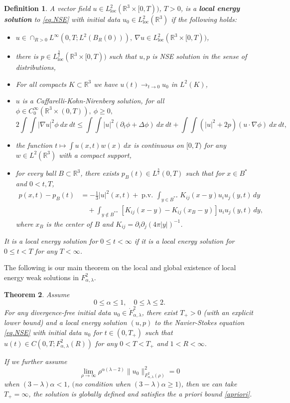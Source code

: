 \documentclass[11pt]{article}
\numberwithin{equation}{section}
\newtheorem{thm}{Theorem}[section]
\newtheorem{defn}[thm]{Definition}
\theoremstyle{remark}
\theoremstyle{definition}
\newcommand{\bkt}[1]{\left [ #1 \right ]}
\newcommand{\R}{\mathbb{R}}
\newcommand\al{\alpha}
\newcommand\la{\lambda}
\newcommand{\pv} {\mathop{\mathrm{p.v.\!}}}
\newcommand{\EQ}[1]{\begin{equation} #1 \end{equation}}
\newcommand{\EQS}[1]{\begin{equation}\begin{split} #1 \end{split}\end{equation}}
\newcommand{\loc}{{\mathrm{loc}}}
\begin{document}
\begin{defn}
  A vector field $u\in L^2_{\loc}(\R^3\times [0,T))$, $T>0$, is a \textbf{local energy solution} to \eqref{eq.NSE} with initial data $u_0\in L^2_{\loc}(\R^3)$ if the following holds:
  \begin{itemize}
    \item $u\in\cap_{R>0}L^{\infty}(0,T;L^2(B_R(0))),~\nabla u\in L^2_{\loc}(\R^3\times[0,T))$,
    \item there is $p\in L^{\frac32}_{\loc}(\R^3\times[0,T))$ such that ${u,p}$ is NSE solution in the sense of distributions,
    \item For all compacts $K\subset\R^3$ we have $u(t)\rightarrow_{t\rightarrow0} u_0$ in $L^2(K)$,
    \item $u$ is a Caffarelli-Kohn-Nirenberg solution, for all $\phi \in C^{\infty}_0(\R^3\times (0,T)),~\phi\ge0,$
    \EQ{
    2\int\int|\nabla u|^2\phi ~dx~dt\le\int\int |u|^2(\partial_t\phi+\Delta \phi)~dx~dt+\int\int(|u|^2+2p)(u\cdot \nabla\phi)~dx~dt,
    }
    \item the function $t\mapsto\int u(x,t)w(x)~dx$ is continuous on $[0,T)$ for any $w\in L^2(\R^3)$ with a compact support,
    \item for every ball $B\subset \R^3$, there exists $p_B(t)\in L^{\frac 32}(0,T)$ such that  for $x\in B^*$ and $0<t,T$,
\EQS{
\label{p.dec}
p(x,t)-p_B(t) &=   - \frac 13 |u|^2(x,t) +\pv \int_{ y\in B^{**}}  K_{ij}(x-y)   u_i u_j(y,t)\,dy
\\&\quad
+  \int_{ y\notin B^{**}}  \bkt{ K_{ij}(x-y) - K_{ij}(x_B - y  )}  u_i u_j(y,t)\,dy,
}
%
%
%
%
%
    where $x_B$ is the center of $B$ and $K_{ij}=\partial_i\partial_j(4\pi|y|)^{-1}$.
  \end{itemize}

It is a local energy solution for $0\le t<\infty$ if it is a local energy solution for $0\le t<T$ for any $T<\infty$.
\end{defn}






The following is our main theorem on the local and global existence of local energy weak solutions in $F^2_{\al,\la}$.

\begin{thm} \label{mainthm}
Assume
\EQ{\label{alla-cond}
0\le \al\le 1, \quad 0\le \la\le 2.
}
%
%
%
For any divergence-free initial data $u_0\in \mathring F^2_{\al,\la}$, there exist $T_+>0$ (with an explicit lower bound) and a local energy solution $(u,p)$ to the Navier-Stokes equation \eqref{eq.NSE} with initial data $u_0$ for $t \in (0,T_+)$ such that $u(t) \in C(0,T; F^2_{\al,\la}(R))$ for any $0<T<T_+$ and $1<R<\infty$.

If we further assume
\EQ{\label{vanishing}
\lim_{\rho\to \infty} \rho^{\al(\la-2)} \|u_0\|^2_{F^{2}_{\al,\lambda}(\rho)} =0
}
when $(3-\la)\al<1$, $($no condition when $(3-\la)\al\ge 1)$, then we can take $T_+=\infty$, the solution is globally defined and satisfies the a priori bound \eqref{apriori}. %
\end{thm}
\end{document}
